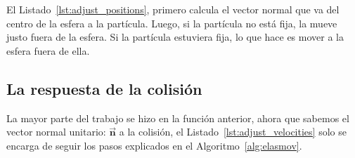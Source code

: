 
El Listado~\ref{lst:adjust_positions}, primero calcula el vector normal que va del centro de la esfera a la partícula.
Luego, si la partícula no está fija, la mueve justo fuera de la esfera.
Si la partícula estuviera fija, lo que hace es mover a la esfera fuera de ella.

\subsection{La respuesta de la colisión}
La mayor parte del trabajo se hizo en la función anterior, ahora que sabemos el vector normal unitario: $\vec{\textbf{n}}$ a la colisión, el Listado~\ref{lst:adjust_velocities} solo se encarga de seguir los pasos explicados en el Algoritmo~\ref{alg:elasmov}.

